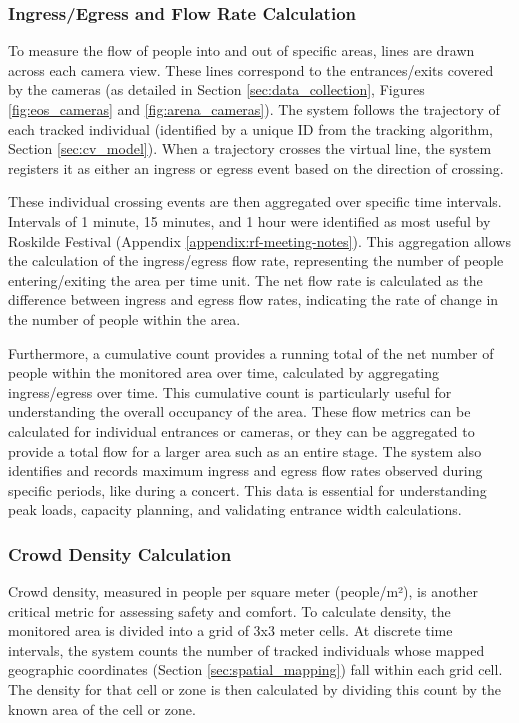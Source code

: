 \subsubsection{Ingress/Egress and Flow Rate Calculation}

To measure the flow of people into and out of specific areas, lines are drawn across each camera view. These lines correspond to the entrances/exits covered by the cameras (as detailed in Section \ref{sec:data_collection}, Figures \ref{fig:eos_cameras} and \ref{fig:arena_cameras}). The system follows the trajectory of each tracked individual (identified by a unique ID from the tracking algorithm, Section \ref{sec:cv_model}). When a trajectory crosses the virtual line, the system registers it as either an ingress or egress event based on the direction of crossing.

These individual crossing events are then aggregated over specific time intervals. Intervals of 1 minute, 15 minutes, and 1 hour were identified as most useful by Roskilde Festival (Appendix \ref{appendix:rf-meeting-notes}). This aggregation allows the calculation of the ingress/egress flow rate, representing the number of people entering/exiting the area per time unit. The net flow rate is calculated as the difference between ingress and egress flow rates, indicating the rate of change in the number of people within the area.

Furthermore, a cumulative count provides a running total of the net number of people within the monitored area over time, calculated by aggregating ingress/egress over time. This cumulative count is particularly useful for understanding the overall occupancy of the area. These flow metrics can be calculated for individual entrances or cameras, or they can be aggregated to provide a total flow for a larger area such as an entire stage. The system also identifies and records maximum ingress and egress flow rates observed during specific periods, like during a concert. This data is essential for understanding peak loads, capacity planning, and validating entrance width calculations.

\subsubsection{Crowd Density Calculation}
Crowd density, measured in people per square meter (people/m²), is another critical metric for assessing safety and comfort. To calculate density, the monitored area is divided into a grid of 3x3 meter cells. At discrete time intervals, the system counts the number of tracked individuals whose mapped geographic coordinates (Section \ref{sec:spatial_mapping}) fall within each grid cell. The density for that cell or zone is then calculated by dividing this count by the known area of the cell or zone.

